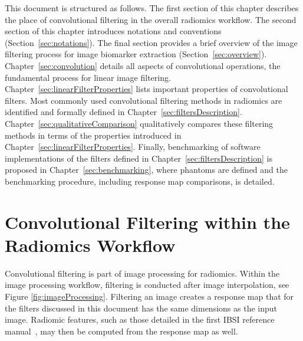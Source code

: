 \documentclass[fleqn,a4paper,oneside,openany]{book}
\begin{document}
This document is structured as follows.
The first section of this chapter describes the place of convolutional filtering in the overall radiomics workflow.
The second section of this chapter introduces notations and conventions (Section~\ref{sec:notations}).
The final section provides a brief overview of the image filtering process for image biomarker extraction (Section~\ref{sec:overview}).
Chapter~\ref{sec:convolution} details all aspects of convolutional operations, the fundamental process for linear image filtering.
Chapter~\ref{sec:linearFilterProperties} lists important properties of convolutional filters.
Most commonly used convolutional filtering methods in radiomics are identified and formally defined in Chapter~\ref{sec:filtersDescription}.
Chapter~\ref{sec:qualitativeComparison} qualitatively compares these filtering methods in terms of the properties introduced in Chapter~\ref{sec:linearFilterProperties}.
Finally, benchmarking of software implementations of the filters defined in Chapter~\ref{sec:filtersDescription} is proposed in Chapter~\ref{sec:benchmarking}, where phantoms are defined and the benchmarking procedure, including response map comparisons, is detailed. 

\section{Convolutional Filtering within the Radiomics Workflow}\label{sec:overallWorkflow}
Convolutional filtering is part of image processing for radiomics. Within the image processing workflow, filtering is conducted after image interpolation, see Figure \ref{fig:imageProcessing}. Filtering an image creates a response map that for the filters discussed in this document has the same dimensions as the input image. Radiomic features, such as those detailed in the first IBSI reference manual~\cite{ZLV2017}, may then be computed from the response map as well.
\end{document}
